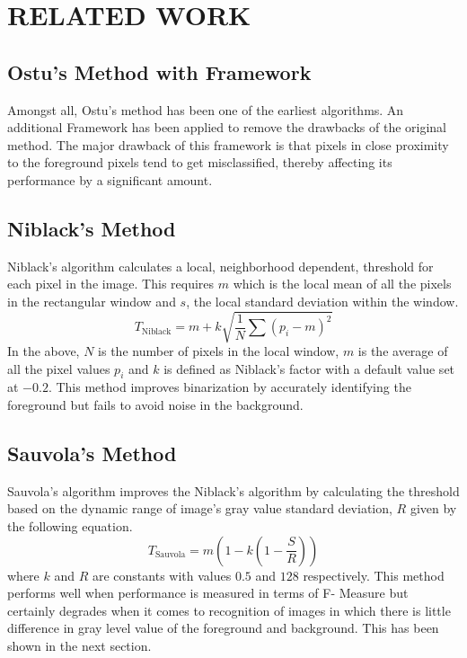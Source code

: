 \documentclass[conference]{IEEEtran}
\begin{document}
\section{RELATED WORK}

\subsection{Ostu's Method with Framework}
Amongst all, Ostu's \cite{otsu1979threshold} method has been one of the earliest algorithms. An additional Framework \cite{chi2012learning} has been applied to remove the drawbacks of the original method. The major drawback of this framework is that pixels in close proximity to the foreground pixels tend to get misclassified, thereby affecting its performance by a significant amount.

\subsection{Niblack's Method}
Niblack's algorithm \cite{niblack1986introduction} calculates a local, neighborhood dependent, threshold for each pixel in the image. This requires $m$ which is the local mean of all the pixels in the rectangular window and $s$, the local standard deviation within the window.
\begin{equation}
T_{\text{Niblack}} = m + k\sqrt{\frac{1}{N}\sum(p_i - m)^2}
\end{equation}
In the above, $N$ is the number of pixels in the local window, $m$ is the average of all the pixel values $p_i$ and $k$ is defined as Niblack's factor with a default value set at $-0.2$. This method improves binarization by accurately identifying the foreground but fails to avoid noise in the background.

\subsection{Sauvola's Method}
Sauvola's algorithm \cite{sauvola1997adaptive} improves the Niblack's algorithm by calculating the threshold based on the dynamic range of image's gray value standard deviation, $R$ given by the following equation.
\begin{equation}
T_{\text{Sauvola}} = m\left(1 - k\left(1 - \frac{S}{R}\right)\right)
\end{equation}
where $k$ and $R$ are constants with values $0.5$ and $128$ respectively. This method performs well when performance is measured in terms of F- Measure but certainly degrades when it comes to recognition of images in which there is little difference in gray level value of the foreground and background. This has been shown in the next section.
\end{document}

